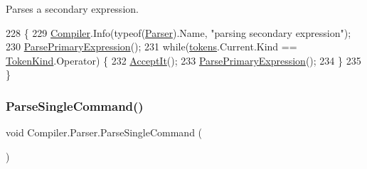 Parses a secondary expression. 
\begin{DoxyCode}
228                                                               \{
229                         \mbox{\hyperlink{namespace_compiler}{Compiler}}.Info(typeof(\mbox{\hyperlink{class_compiler_1_1_parser_a450e11452db3f91ff866fc1e36ebc79d}{Parser}}).Name, \textcolor{stringliteral}{"parsing secondary expression"});
230                         \mbox{\hyperlink{class_compiler_1_1_parser_a9ce17cf1f3fa7062daf05481f3230330}{ParsePrimaryExpression}}();
231                         \textcolor{keywordflow}{while}(\mbox{\hyperlink{class_compiler_1_1_parser_a4db075175c853a197c7b8db7d787a0a5}{tokens}}.Current.Kind == \mbox{\hyperlink{namespace_compiler_a57929962f25004759596fc3f13cf563c}{TokenKind}}.Operator) \{
232                             \mbox{\hyperlink{class_compiler_1_1_parser_ae19e507e1e2460cbad35b03d24402b4f}{AcceptIt}}();
233                             \mbox{\hyperlink{class_compiler_1_1_parser_a9ce17cf1f3fa7062daf05481f3230330}{ParsePrimaryExpression}}();
234                         \}
235                     \}
\end{DoxyCode}
\mbox{\label{class_compiler_1_1_parser_af315f582be84f8e1b37add91efa3afc0}} 
\subsubsection{\texorpdfstring{Parse\+Single\+Command()}{ParseSingleCommand()}}
{\footnotesize\ttfamily void Compiler.\+Parser.\+Parse\+Single\+Command (\begin{DoxyParamCaption}{ }\end{DoxyParamCaption})\hspace{0.3cm}{\ttfamily [protected]}}

